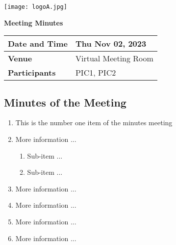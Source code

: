 \documentclass[a4wide,10pt]{extarticle}
\begin{document}
\hspace{-1cm}\begin{minipage}[b]{0.47\linewidth}
    \begin{center}{\large
    {\bf  } }\end{center}
\end{minipage}
\begin{minipage}[b]{0.15\linewidth}
    \texttt{[image: logoA.jpg]}
\end{minipage}

\begin{center}\large
    \textbf{Meeting Minutes}
    \vspace{0.33cm}
\end{center}

\begin{center}
    \begin{tabular}{| m{2.8cm} | m{13.6cm} |} \hline
        \textbf{Date and Time} & Thu Nov 02, 2023 \\ \hline
        \textbf{Venue} & Virtual Meeting Room \\ \hline
        \textbf{Participants} & PIC1, PIC2 \\ \hline
    \end{tabular}
\end{center}

\subsection*{Minutes of the Meeting}
\begin{center}
    \begin{enumerate}
        \item This is the number one item of the minutes meeting
        \item More information ...
        \begin{enumerate}
            \item Sub-item ...
            \item Sub-item ...
        \end{enumerate}
        \item More information ...
        \item More information ...
        \item More information ...
        \item More information ...
    \end{enumerate}
\end{center}
\end{document}
